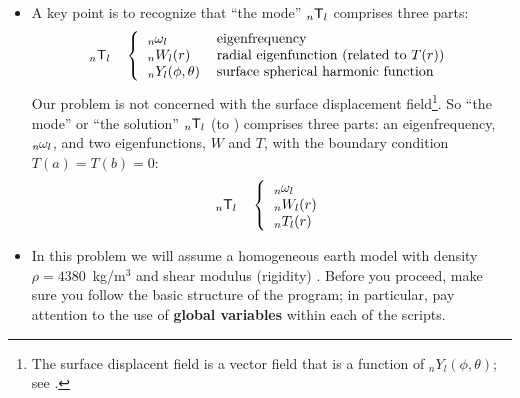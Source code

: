\documentclass[11pt,titlepage,fleqn]{article}
\newcommand{\tnl}[2]{\mbox{$_{#1}\ssT_{#2}$}}
\newcommand{\Tnl}{\mbox{${}_nT_l$}}   %
\newcommand{\Wnl}{\mbox{${}_nW_l$}}   %
\newcommand{\Ynl}{\mbox{${}_nY_l$}}   %
\newcommand{\omnl}{\mbox{${}_{n\hspace{-0.2 mm}}\omega_l$}}  %
\begin{document}
\begin{itemize}
\item A key point is to recognize that ``the mode'' \tnl{n}{l} comprises three parts:
%
\begin{equation}
\tnl{n}{l} \hspace{10pt} \left\{
\begin{tabular}{ll}
$\omnl$ & eigenfrequency \\
$\Wnl(r)$ & radial eigenfunction (related to $T(r)$) \\
$\Ynl(\phi,\theta)$ & surface spherical harmonic function
\end{tabular} \right.
\end{equation}
%
Our problem is not concerned with the surface displacement field\footnote{The surface displacent field is a vector field that is a function of $\Ynl(\phi,\theta)$; see \citet[][Section 8.6.1]{DT}.}.
So ``the mode'' or ``the solution'' \tnl{n}{l} (to ) comprises three parts: an eigenfrequency, $\omnl$, and two eigenfunctions, $W$ and $T$, with the boundary condition $T(a) = T(b) = 0$:
%
\begin{equation}
\tnl{n}{l} \hspace{10pt} \left\{
\begin{tabular}{ll}
$\omnl$  \\
$\Wnl(r)$ \\
$\Tnl(r)$ 
\end{tabular} \right.
\end{equation}
%

\item In this problem we will assume a homogeneous earth model with density $\rho = 4380$~kg/m$^3$ and shear modulus (rigidity) . Before you proceed, make sure you follow the basic structure of the program; in particular, pay attention to the use of {\bf global variables} within each of the scripts.
\end{itemize}
\end{document}
